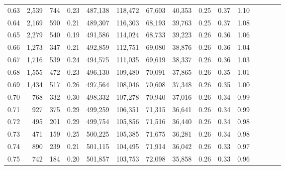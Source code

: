 \begin{tabular}{rrrcrrrrrrrrrrr}
0.63 &   2,539 &    744 &                                       0.23 &  487,138 &  118,472 &   67,603 &   40,353 &  0.25 &  0.37 &                         1.10 \\
0.64 &   2,169 &    590 &                                       0.21 &  489,307 &  116,303 &   68,193 &   39,763 &  0.25 &  0.37 &                         1.08 \\
0.65 &   2,279 &    540 &                                       0.19 &  491,586 &  114,024 &   68,733 &   39,223 &  0.26 &  0.36 &                         1.06 \\
0.66 &   1,273 &    347 &                                       0.21 &  492,859 &  112,751 &   69,080 &   38,876 &  0.26 &  0.36 &                         1.04 \\
0.67 &   1,716 &    539 &                                       0.24 &  494,575 &  111,035 &   69,619 &   38,337 &  0.26 &  0.36 &                         1.03 \\
0.68 &   1,555 &    472 &                                       0.23 &  496,130 &  109,480 &   70,091 &   37,865 &  0.26 &  0.35 &                         1.01 \\
0.69 &   1,434 &    517 &                                       0.26 &  497,564 &  108,046 &   70,608 &   37,348 &  0.26 &  0.35 &                         1.00 \\
0.70 &     768 &    332 &                                       0.30 &  498,332 &  107,278 &   70,940 &   37,016 &  0.26 &  0.34 &                         0.99 \\
0.71 &     927 &    375 &                                       0.29 &  499,259 &  106,351 &   71,315 &   36,641 &  0.26 &  0.34 &                         0.99 \\
0.72 &     495 &    201 &                                       0.29 &  499,754 &  105,856 &   71,516 &   36,440 &  0.26 &  0.34 &                         0.98 \\
0.73 &     471 &    159 &                                       0.25 &  500,225 &  105,385 &   71,675 &   36,281 &  0.26 &  0.34 &                         0.98 \\
0.74 &     890 &    239 &                                       0.21 &  501,115 &  104,495 &   71,914 &   36,042 &  0.26 &  0.33 &                         0.97 \\
0.75 &     742 &    184 &                                       0.20 &  501,857 &  103,753 &   72,098 &   35,858 &  0.26 &  0.33 &                         0.96 \\

\end{tabular}
